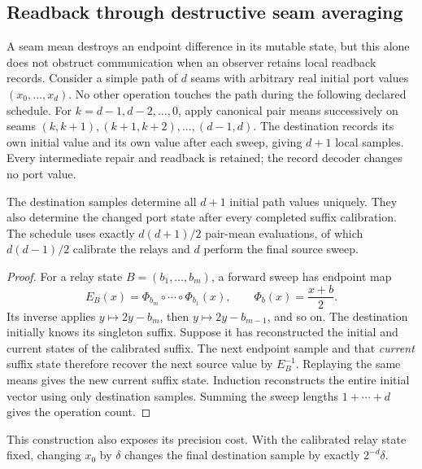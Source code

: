 \subsection{Readback through destructive seam averaging}
\label{sec:source-seam-path-tomography}

A seam mean destroys an endpoint difference in its mutable state, but this
alone does not obstruct communication when an observer retains local
readback records. Consider a simple path of $d$ seams with arbitrary real
initial port values $(x_0,\ldots,x_d)$. No other operation touches the path
during the following declared schedule. For $k=d-1,d-2,\ldots,0$, apply
canonical pair means successively on seams
$(k,k+1),(k+1,k+2),\ldots,(d-1,d)$.
The destination records its own initial value and its own value after each
sweep, giving $d+1$ local samples. Every intermediate repair and readback is
retained; the record decoder changes no port value.

\begin{theorem}
\label{thm:source-seam-path-tomography}
The destination samples determine all $d+1$ initial path values uniquely.
They also determine the changed port state after every completed suffix
calibration. The schedule uses exactly $d(d+1)/2$ pair-mean evaluations, of which
$d(d-1)/2$ calibrate the relays and $d$ perform the final source sweep.
\end{theorem}
\begin{proof}
For a relay state $B=(b_1,\ldots,b_m)$, a forward sweep has endpoint map
\[
 E_B(x)=\Phi_{b_m}\circ\cdots\circ\Phi_{b_1}(x),
 \qquad \Phi_b(x)=\frac{x+b}{2}.
\]
Its inverse applies $y\mapsto2y-b_m$, then $y\mapsto2y-b_{m-1}$,
and so on. The destination initially knows its singleton suffix. Suppose
it has reconstructed the initial and current states of the calibrated
suffix. The next endpoint sample and that \emph{current} suffix state
therefore recover the next source value by $E_B^{-1}$. Replaying the same
means gives the new current suffix state. Induction reconstructs the
entire initial vector using only destination samples. Summing the sweep
lengths $1+\cdots+d$ gives the operation count.
\end{proof}

This construction also exposes its precision cost. With the calibrated
relay state fixed, changing $x_0$ by $\delta$ changes the final destination
sample by exactly $2^{-d}\delta$.

